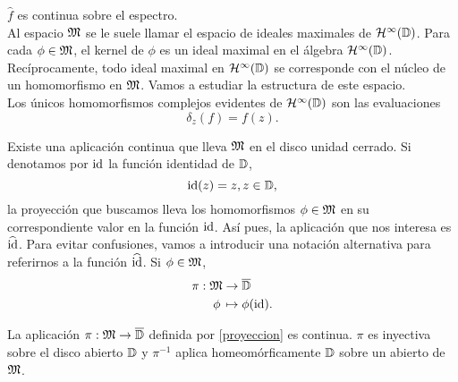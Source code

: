 $\widehat f$ es continua sobre el espectro. \\

Al espacio $\mathfrak{M}$ se le suele llamar el espacio de ideales maximales de $\mathcal{H}^{\infty}(\mathbb{D})$. Para cada $\phi \in \mathfrak{M}$, el kernel de $\phi$ es un ideal maximal en el álgebra $\mathcal{H}^{\infty}(\mathbb{D})$. Recíprocamente, todo ideal maximal en $\mathcal{H}^{\infty}(\mathbb{D})$ se corresponde con el núcleo de un homomorfismo en $\mathfrak{M}$. Vamos a estudiar la estructura de este espacio. \\

Los únicos homomorfismos complejos evidentes de $\mathcal{H}^{\infty}(\mathbb{D})$ son las evaluaciones
\begin{equation*}
    \delta_z (f) = f(z).
\end{equation*}


Existe una aplicación continua que lleva $\mathfrak{M}$ en el disco unidad cerrado. Si denotamos por $\operatorname{id}$ la función identidad de $\mathbb{D}$,
\begin{equation*}
    \operatorname{id}(z) = z, z \in \mathbb{D},
\end{equation*}
la proyección que buscamos lleva los homomorfismos $\phi \in \mathfrak{M}$ en su correspondiente valor en la función $\operatorname{id}$. Así pues, la aplicación que nos interesa es $\widehat {\operatorname{id}}$. Para evitar confusiones, vamos a introducir una notación alternativa para referirnos a la función $\widehat {\operatorname{id}}$. Si $\phi \in \mathfrak{M}$,
\begin{equation}
    \label{proyeccion}
    \begin{split}
        \pi: \mathfrak{M} & \rightarrow \overline{\mathbb{D}} \\
            \phi \, & \mapsto  \phi (\operatorname{id}).
    \end{split}
\end{equation}


\begin{theorem}
    La aplicación $\pi: \mathfrak{M} \rightarrow \overline{\mathbb{D}}$ definida por \ref{proyeccion} es continua. $\pi$ es inyectiva sobre el disco abierto $\mathbb{D}$ y $\pi^{-1}$ aplica homeomórficamente $\mathbb{D}$ sobre un abierto de $\mathfrak{M}$.
\end{theorem}

